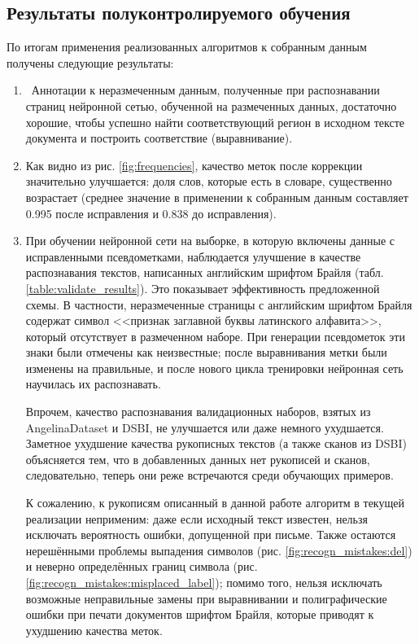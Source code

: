 \documentclass{main.tex}[subfiles]
\begin{document}
\subsection{Результаты полуконтролируемого обучения}
По итогам применения реализованных алгоритмов к собранным данным получены следующие результаты:
\begin{enumerate}[noitemsep]
	\item  Аннотации к неразмеченным данным, полученные при распознавании страниц нейронной сетью, обученной на размеченных данных, достаточно хорошие, чтобы успешно найти соответствующий регион в исходном тексте документа и построить соответствие (выравнивание).
	\item Как видно из рис. \ref{fig:frequencies}, качество меток после коррекции значительно улучшается: доля слов, которые есть в словаре, существенно возрастает (среднее значение в применении к собранным данным составляет 0.995 после исправления и 0.838 до исправления).
	\item При обучении нейронной сети на выборке, в которую включены данные с исправленными псевдометками, наблюдается улучшение в качестве распознавания текстов, написанных английским шрифтом Брайля (табл. \ref{table:validate_results}).
	Это показывает эффективность предложенной схемы.
	В частности, неразмеченные страницы с английским шрифтом Брайля содержат символ <<признак заглавной буквы латинского алфавита>>, который отсутствует в размеченном наборе.
	При генерации псевдометок эти знаки были отмечены как неизвестные; после выравнивания метки были изменены на правильные, и после нового цикла тренировки нейронная сеть научилась их распознавать.

	Впрочем, качество распознавания валидационных наборов, взятых из An\-ge\-li\-na\-Da\-ta\-set и DSBI, не улучшается или даже немного ухудшается.
	Заметное ухудшение качества рукописных текстов (а также сканов из DSBI) объясняется тем, что в добавленных данных нет рукописей и сканов, следовательно, теперь они реже встречаются среди обучающих примеров.

    К сожалению, к рукописям описанный в данной работе алгоритм в текущей реализации неприменим: даже если исходный текст известен, нельзя исключать вероятность ошибки, допущенной при письме.
    Также остаются нерешёнными проблемы выпадения символов (рис. \ref{fig:recogn_mistakes:del}) и неверно определённых границ символа (рис. \ref{fig:recogn_mistakes:misplaced_label}); помимо того, нельзя исключать возможные неправильные замены при выравнивании и полиграфические ошибки при печати документов шрифтом Брайля, которые приводят к ухудшению качества меток.
\end{enumerate}
\end{document}
